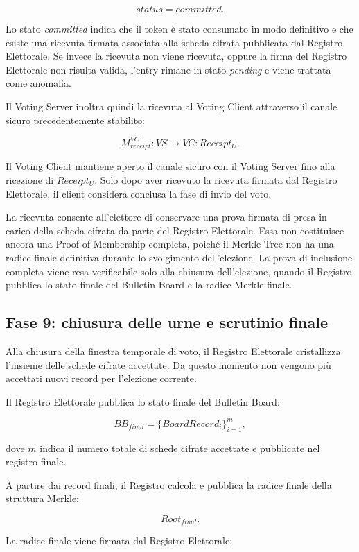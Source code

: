 \documentclass[a4paper,12pt]{article}
\begin{document}
\[
	status = committed.
\]

Lo stato \emph{committed} indica che il token \`e stato consumato in modo definitivo e che esiste una ricevuta firmata associata alla scheda cifrata pubblicata dal Registro Elettorale.
Se invece la ricevuta non viene ricevuta, oppure la firma del Registro Elettorale non risulta valida, l'entry rimane in stato \emph{pending} e viene trattata come anomalia.

Il Voting Server inoltra quindi la ricevuta al Voting Client attraverso il canale sicuro precedentemente stabilito:

\[
	M_{receipt}^{VC} : VS \rightarrow VC :
	Receipt_U.
\]

Il Voting Client mantiene aperto il canale sicuro con il Voting Server fino alla ricezione di \(Receipt_U\).
Solo dopo aver ricevuto la ricevuta firmata dal Registro Elettorale, il client considera conclusa la fase di invio del voto.

La ricevuta consente all'elettore di conservare una prova firmata di presa in carico della scheda cifrata da parte del Registro Elettorale.
Essa non costituisce ancora una Proof of Membership completa, poich\'e il Merkle Tree non ha una radice finale definitiva durante lo svolgimento dell'elezione.
La prova di inclusione completa viene resa verificabile solo alla chiusura dell'elezione, quando il Registro pubblica lo stato finale del Bulletin Board e la radice Merkle finale.

\subsection{Fase 9: chiusura delle urne e scrutinio finale}

Alla chiusura della finestra temporale di voto, il Registro Elettorale cristallizza l'insieme delle schede cifrate accettate.
Da questo momento non vengono pi\`u accettati nuovi record per l'elezione corrente.

Il Registro Elettorale pubblica lo stato finale del Bulletin Board:

\[
	BB_{final} =
	\{BoardRecord_i\}_{i=1}^{m},
\]

dove \(m\) indica il numero totale di schede cifrate accettate e pubblicate nel registro finale.

A partire dai record finali, il Registro calcola e pubblica la radice finale della struttura Merkle:

\[
	Root_{final}.
\]

La radice finale viene firmata dal Registro Elettorale:
\end{document}

